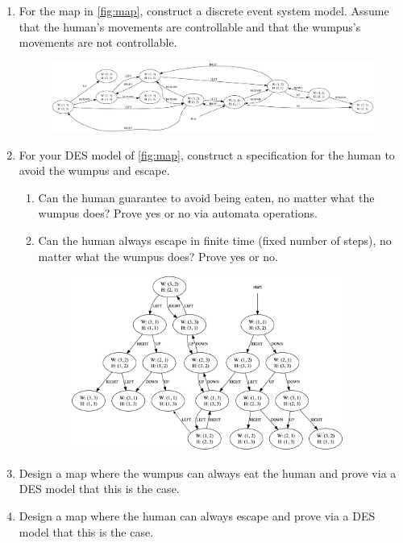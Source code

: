 \documentclass[12pt,letterpaper]{ntdhw}
\begin{document}
\begin{enumerate}

  \item For the map in \ref{fig:map}, construct a discrete event
  system model.  Assume that the human's movements are controllable
  and that the wumpus's movements are not controllable.

  \begin{figure}[ht]
      \centering
      \includegraphics[width=1.0\textwidth]{wumpus1.png}
  \end{figure}

\clearpage

  \item For your DES model of \ref{fig:map}, construct a specification
  for the human to avoid the wumpus and escape.
  \begin{enumerate}
    \item Can the human guarantee to avoid being eaten, no matter what
    the wumpus does?  Prove yes or no via automata operations.
    \item Can the human always escape in finite time (fixed
    number of steps), no matter what the wumpus does?  Prove yes or
    no.

    \begin{figure}[ht]
      \centering
      \includegraphics[width=0.9\textwidth]{2_wumpus.png}
  \end{figure}
  \end{enumerate}

  \item Design a map where the wumpus can always eat the human and
  prove via a DES model that this is the case.

  \item Design a map where the human can always escape and prove via a
  DES model that this is the case.

\end{enumerate}
\end{document}
